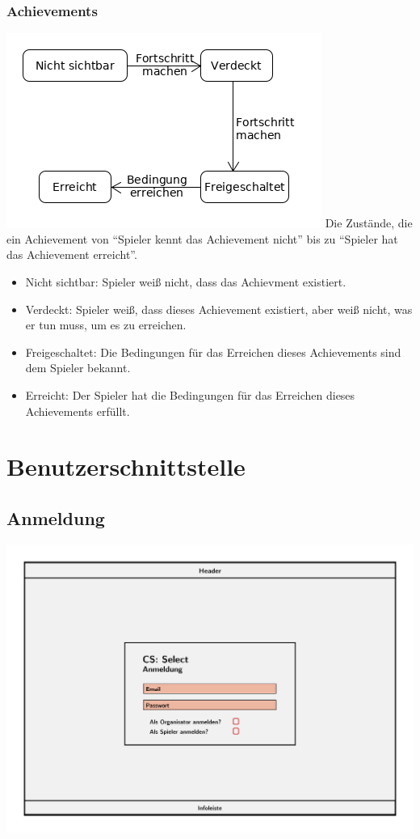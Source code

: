 \documentclass[a4paper]{scrreprt}
\begin{document}
    \subsection{Achievements}
    \label{fig:Achievment_State}
    \includegraphics[width=\textwidth]{uml/export/Achievment_State.png}
    Die Zustände, die ein \Gls{Achievement} von \enquote{Spieler kennt das \Gls{Achievement} nicht} bis zu \enquote{Spieler hat das Achievement erreicht}.
    \begin{itemize}
    \item Nicht sichtbar: Spieler weiß nicht, dass das Achievment existiert.
    \item Verdeckt: Spieler weiß, dass dieses \Gls{Achievement} existiert, aber weiß nicht, was er tun muss, um es zu erreichen.
    \item Freigeschaltet: Die Bedingungen für das Erreichen dieses Achievements sind dem Spieler bekannt.
    \item Erreicht: Der Spieler hat die Bedingungen für das Erreichen dieses Achievements erfüllt.
    \end{itemize}
    

    \chapter{Benutzerschnittstelle}

    \section{Anmeldung}
    \centering
    \includegraphics[width=\textwidth]{../pictures/Anmeldung.jpg}
\end{document}
